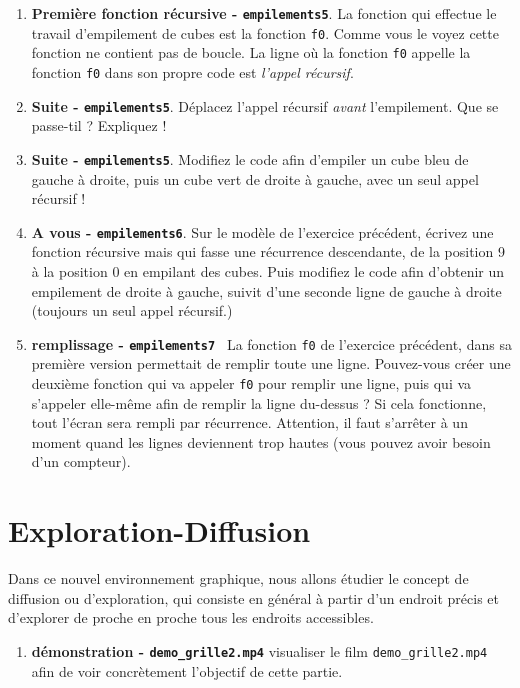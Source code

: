 \documentclass[11pt,a4paper]{article}
\newcommand{\checkbox}{$\square$ \smallskip}
\newcounter{exo} \setcounter{exo}{0}
\newenvironment{action}{%
    \begin{enumerate}[\numerotation] \addtocounter{exo}{-1}%
        }{%
    \end{enumerate}
}
\newcommand{\numexoa}{\theexo \addtocounter{exo}{1}}
\newcommand{\numerotation}{\checkbox \smallskip \numexoa.}
\begin{document}
\begin{action}
\item {\bf Première fonction récursive - \tt empilements5}. La fonction qui effectue le travail d'empilement de cubes est la fonction {\tt f0}. 
Comme vous le voyez cette fonction ne contient pas de boucle.  La ligne où la fonction {\tt f0}
appelle la fonction {\tt f0} dans son propre code est \emph{l'appel récursif}. 
\item {\bf Suite - \tt empilements5}. Déplacez l'appel récursif \emph{avant} l'empilement. Que se passe-til ? Expliquez !
\item {\bf Suite - \tt empilements5}. Modifiez le code afin d'empiler un cube bleu de gauche à droite, puis un cube vert
de droite à gauche, avec un seul appel récursif !
\item {\bf A vous - \tt empilements6}. Sur le modèle de l'exercice précédent, écrivez une fonction récursive mais qui
fasse une récurrence descendante, de la position 9 à la position 0 en empilant des cubes. Puis modifiez le code afin
d'obtenir un empilement de droite à gauche, suivit d'une seconde ligne de gauche à droite (toujours un seul appel récursif.)
\item {\bf remplissage - \tt empilements7 } La fonction {\tt f0} de l'exercice précédent, dans sa première version permettait de remplir
toute une ligne. Pouvez-vous créer une deuxième fonction qui va appeler {\tt f0} pour remplir une ligne, 
puis qui va s'appeler elle-même afin de remplir la ligne du-dessus ? Si cela fonctionne, tout l'écran sera rempli par récurrence.
Attention, il faut s'arrêter à un moment quand les lignes deviennent trop hautes (vous pouvez avoir besoin d'un compteur).
\end{action}


\section{Exploration-Diffusion}

Dans ce nouvel environnement graphique, nous allons étudier le concept de diffusion ou d'exploration, 
qui consiste en général à partir d'un endroit précis et d'explorer de proche en proche tous les endroits accessibles.


\begin{action}
\item {\bf démonstration - \tt demo\_grille2.mp4} visualiser le film {\tt demo\_grille2.mp4} afin de voir concrètement l'objectif de cette partie.
\end{action}
\end{document}

